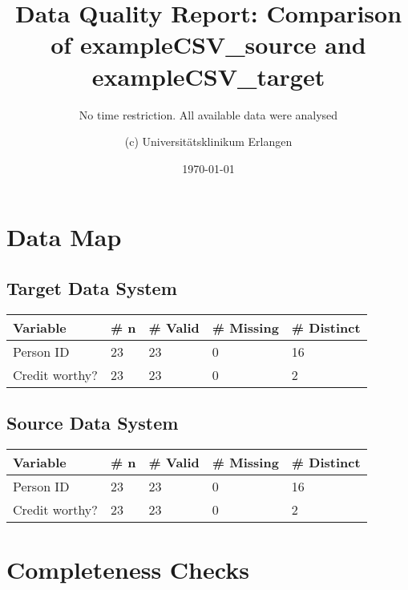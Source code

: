 \documentclass[
]{article}
\title{Data Quality Report: Comparison of exampleCSV\_source and
exampleCSV\_target}
\subtitle{No time restriction. All available data were analysed}
\author{(c) Universitätsklinikum Erlangen}
\date{\today}
\begin{document}
\maketitle

{
\setcounter{tocdepth}{2}
\tableofcontents
}
\newpage

\hypertarget{data-map}{%
\section{Data Map}\label{data-map}}

\hypertarget{target-data-system}{%
\subsection{Target Data System}\label{target-data-system}}

\begin{table}[H]
\centering
\begin{tabular}{l|l|l|l|l}
\hline
\textbf{Variable} & \textbf{\# n} & \textbf{\# Valid} & \textbf{\# Missing} & \textbf{\# Distinct}\\
\hline
Person ID & 23 & 23 & 0 & 16\\
\hline
Credit worthy? & 23 & 23 & 0 & 2\\
\hline
\end{tabular}
\end{table}

\hypertarget{source-data-system}{%
\subsection{Source Data System}\label{source-data-system}}

\begin{table}[H]
\centering
\begin{tabular}{l|l|l|l|l}
\hline
\textbf{Variable} & \textbf{\# n} & \textbf{\# Valid} & \textbf{\# Missing} & \textbf{\# Distinct}\\
\hline
Person ID & 23 & 23 & 0 & 16\\
\hline
Credit worthy? & 23 & 23 & 0 & 2\\
\hline
\end{tabular}
\end{table}

\newpage

\hypertarget{completeness-checks}{%
\section{Completeness Checks}\label{completeness-checks}}
\end{document}
